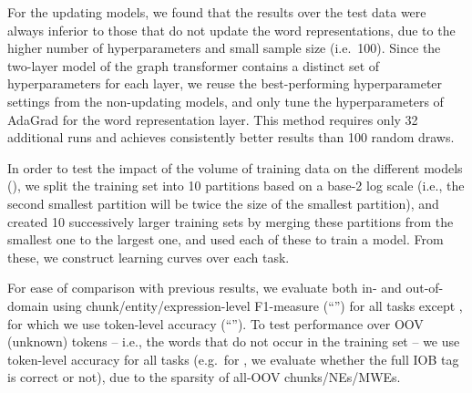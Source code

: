 For the updating models, we found that the results over the test data
were always inferior to those that do not update the word
representations, due to the higher number of hyperparameters and small
sample size (i.e.\ 100).
Since the two-layer model of the graph transformer contains a distinct
set of hyperparameters for each layer, we reuse the best-performing
hyperparameter settings from the non-updating models, and only tune the
hyperparameters of AdaGrad for the word representation layer. 
This method requires only 32 additional runs and achieves consistently
better results than 100 random draws.

In order to test the impact of the volume of training data on the
different models (\RQ[2]), we split the training set into 10 partitions based on
a base-2 log scale (i.e., the second smallest partition will be twice
the size of the smallest partition), and created 10 successively larger
training sets by merging these partitions from the smallest one to the
largest one, and used each of these to train a model.
From these, we construct learning curves over each task.

For ease of comparison with previous results, we evaluate both
in- and out-of-domain using 
chunk/entity/expression-level F1-measure (``\fscore'') for all tasks except \pos,
for which we use token-level accuracy (``\accuracy'').
To test performance over OOV (unknown) tokens -- i.e., the words that do
not occur in the training set -- we use token-level accuracy for all
tasks (e.g.\ for \chunking, we evaluate whether the full IOB tag is
correct or not), due to the sparsity of all-OOV chunks/NEs/MWEs.



